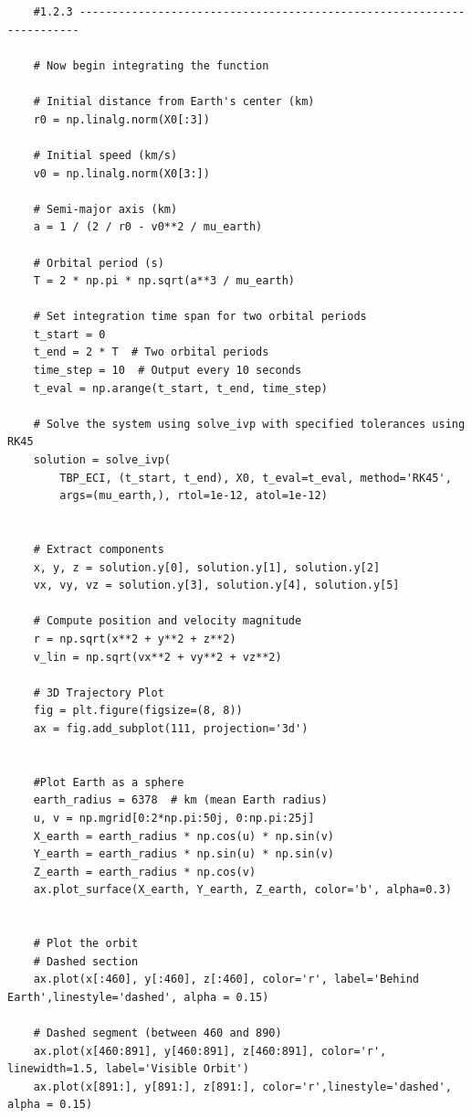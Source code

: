 \documentclass[12pt,twocolumn]{article}  %
\begin{document}
\begin{lstlisting}
    
    
    #1.2.3 ----------------------------------------------------------------------
    
    # Now begin integrating the function 
    
    # Initial distance from Earth's center (km)
    r0 = np.linalg.norm(X0[:3]) 
     
    # Initial speed (km/s)
    v0 = np.linalg.norm(X0[3:]) 
     
    # Semi-major axis (km)
    a = 1 / (2 / r0 - v0**2 / mu_earth)  
    
    # Orbital period (s)
    T = 2 * np.pi * np.sqrt(a**3 / mu_earth)  
    
    # Set integration time span for two orbital periods
    t_start = 0
    t_end = 2 * T  # Two orbital periods
    time_step = 10  # Output every 10 seconds
    t_eval = np.arange(t_start, t_end, time_step)  
    
    # Solve the system using solve_ivp with specified tolerances using RK45
    solution = solve_ivp(
        TBP_ECI, (t_start, t_end), X0, t_eval=t_eval, method='RK45',
        args=(mu_earth,), rtol=1e-12, atol=1e-12)
    
    
    # Extract components
    x, y, z = solution.y[0], solution.y[1], solution.y[2]
    vx, vy, vz = solution.y[3], solution.y[4], solution.y[5]
    
    # Compute position and velocity magnitude 
    r = np.sqrt(x**2 + y**2 + z**2)
    v_lin = np.sqrt(vx**2 + vy**2 + vz**2)
    
    # 3D Trajectory Plot
    fig = plt.figure(figsize=(8, 8))
    ax = fig.add_subplot(111, projection='3d')
    
    
    #Plot Earth as a sphere
    earth_radius = 6378  # km (mean Earth radius)
    u, v = np.mgrid[0:2*np.pi:50j, 0:np.pi:25j]
    X_earth = earth_radius * np.cos(u) * np.sin(v)
    Y_earth = earth_radius * np.sin(u) * np.sin(v)
    Z_earth = earth_radius * np.cos(v)
    ax.plot_surface(X_earth, Y_earth, Z_earth, color='b', alpha=0.3)
    
    
    # Plot the orbit
    # Dashed section 
    ax.plot(x[:460], y[:460], z[:460], color='r', label='Behind Earth',linestyle='dashed', alpha = 0.15)
    
    # Dashed segment (between 460 and 890)
    ax.plot(x[460:891], y[460:891], z[460:891], color='r', linewidth=1.5, label='Visible Orbit')
    ax.plot(x[891:], y[891:], z[891:], color='r',linestyle='dashed', alpha = 0.15)
    

\end{lstlisting}
\end{document}
